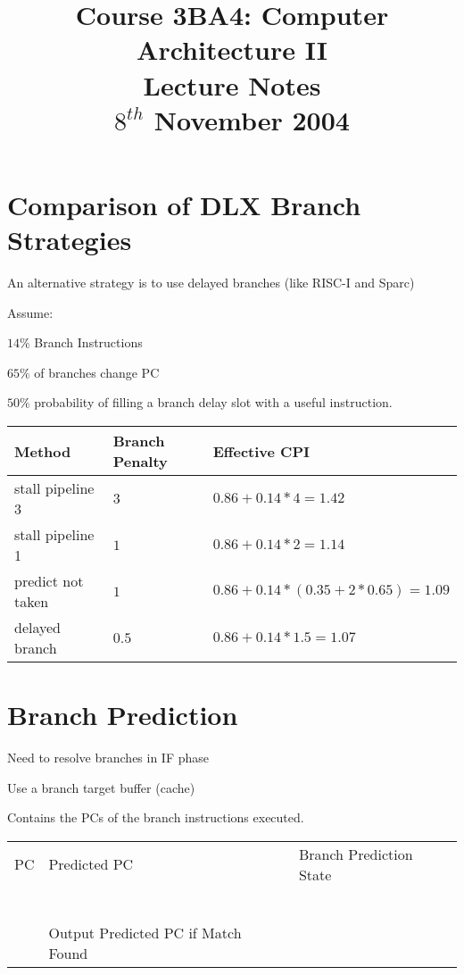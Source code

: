 \documentclass[a4paper,12pt]{article}
\begin{document}
\title{Course 3BA4: Computer Architecture II \\ Lecture Notes \\ $8^{th}$ November 2004}

\maketitle

\section*{Comparison of DLX Branch Strategies}

An alternative strategy is to use delayed branches (like RISC-I and
Sparc)

Assume:

\indent $14\%$ Branch Instructions

\indent $65\%$ of branches change PC

\indent $50\%$ probability of filling a branch delay slot with a useful
instruction.


\begin{tabular}{l|l|l}
Method				&	Branch Penalty	&	Effective CPI				\\
\hline
stall pipeline	3	&	$3$				&	$0.86 + 0.14*4 = 1.42$	\\
\hline
stall pipeline	1	&	$1$				&	$0.86 + 0.14*2 = 1.14$	\\
\hline
predict not taken	&	$1$				&	$0.86 + 0.14*(0.35 + 2 * 0.65) = 1.09$	\\
\hline
delayed branch		&	$0.5$				&	$0.86 + 0.14*1.5 = 1.07$ \\
\end{tabular}

\section*{Branch Prediction}

Need to resolve branches in IF phase

Use a branch target buffer (cache)

Contains the PCs of the branch instructions executed.


\begin{tabular}{|l|l|l|}
\hline
PC				&		Predicted PC		&	Branch Prediction State	\\
				&								&									\\	
				&								&									\\	
				&								&									\\	
				&								&									\\	
				&								&									\\	
				&								&									\\	
\hline

				&	Output Predicted PC if Match Found	&									\\	
\end{tabular}
\end{document}

